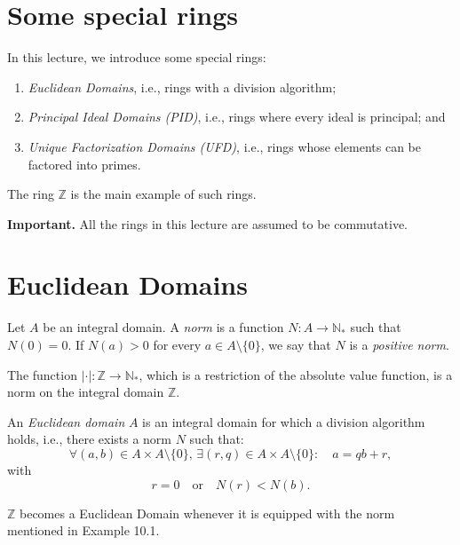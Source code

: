 \documentclass[11pt,a4paper]{article}
\begin{document}
\def\contador{Lesson 12}


\section{Some special rings}

In this lecture, we introduce some special rings:
\begin{enumerate}[label=(\roman*)]
    \item \textit{Euclidean Domains}, i.e., rings with a division algorithm;
    \item \textit{Principal Ideal Domains (PID)}, i.e., rings where every ideal is principal; and
    \item \textit{Unique Factorization Domains (UFD)}, i.e., rings whose elements can be factored into primes.
\end{enumerate}

The ring $\mathbb{Z}$ is the main example of such rings.

\textbf{Important.} All the rings in this lecture are assumed to be commutative.

\section{Euclidean Domains}

Let $A$ be an integral domain. A \textit{norm} is a function $N : A \to \mathbb{N}_*$ such that $N(0) = 0$. If $N(a) > 0$ for every $a \in A \setminus \{0\}$, we say that $N$ is a \textit{positive norm}.

\begin{exa}[10.1]
The function $|\cdot| : \mathbb{Z} \to \mathbb{N}_*$, which is a restriction of the absolute value function, is a norm on the integral domain $\mathbb{Z}$.
\end{exa}

An \textit{Euclidean domain} $A$ is an integral domain for which a division algorithm holds, i.e., there exists a norm $N$ such that:
\[
\forall (a,b) \in A \times A \setminus \{0\}, \, \exists (r,q) \in A \times A \setminus \{0\} : \quad a = qb + r,
\]
with
\[
r = 0 \quad \text{or} \quad N(r) < N(b).
\]

\begin{exa}
$\mathbb{Z}$ becomes a Euclidean Domain whenever it is equipped with the norm mentioned in Example 10.1.
\end{exa}
\end{document}
